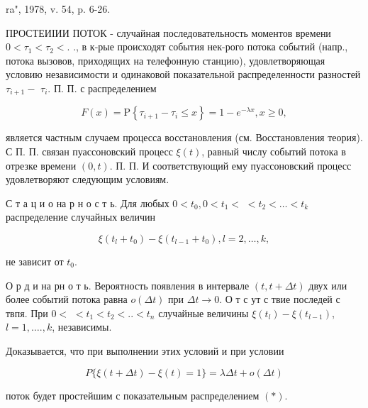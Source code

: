\documentclass[10pt]{article}
\begin{document}
ra", 1978, v. 54, p. 6-26.



ПРОСТЕИІИИ ПОТОК - случайная последовательность моментов времени $0<\tau_{1}<\tau_{2}<$. ., в к-рые происходят события нек-рого потока событий (напр., потока вызовов, приходящих на телефонную станцию), удовлетворяющая условию независимости и одинаковой показательной распределенности разностей $\tau_{i+1}-$ $\tau_{i}$. П. П. с распределением



\[

F(x)=\mathrm{P}\left\{\tau_{i+1}-\tau_{i} \leqslant x\right\}=1-e^{-\lambda x}, x \geqslant 0,

\]



является частным случаем процесса восстановления (см. Восстановления теория). С П. П. связан пуассоновский процесс $\xi(t)$, равный числу событий потока в отрезке времени $(0, t)$. П. П. И соответствующий ему пуассоновский процесс удовлетворяют следующим условиям.



С т а ц и о на р н о с т ь. Для любых $0<t_{0}, 0<t_{1}<$ $<t_{2}<\ldots<t_{k}$ распределение случайных величин



\[

\xi\left(t_{l}+t_{0}\right)-\xi\left(t_{l-1}+t_{0}\right), l=2, \ldots, k,

\]



не зависит от $t_{0}$.



О р д и на рн о т ь. Вероятность появления в интервале $(t, t+\Delta t)$ двух или более событий потока равна $o(\Delta t)$ при $\Delta t \rightarrow 0$. О т с ут с твие последей с твпя. При $0<$ $<t_{1}<t_{2}<. .<t_{n}$ случайные величины $\xi\left(t_{l}\right)-\xi\left(t_{l-1}\right)$, $l=1, \ldots ., k$, независимы.



Доказывается, что при выполнении этих условий и при условии



\[

P\{\xi(t+\Delta t)-\xi(t)=1\}=\lambda \Delta t+o(\Delta t)

\]



поток будет простейшим с показательным распределением $(*)$.
\end{document}
